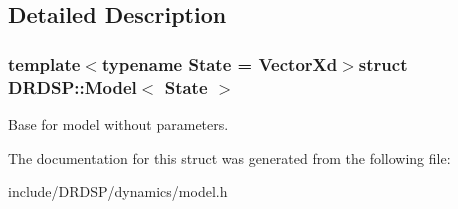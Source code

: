 \subsection{Detailed Description}
\subsubsection*{template$<$typename State = Vector\-Xd$>$struct D\-R\-D\-S\-P\-::\-Model$<$ State $>$}

Base for model without parameters. 

The documentation for this struct was generated from the following file\-:\begin{DoxyCompactItemize}
\item 
include/\-D\-R\-D\-S\-P/dynamics/model.\-h\end{DoxyCompactItemize}
